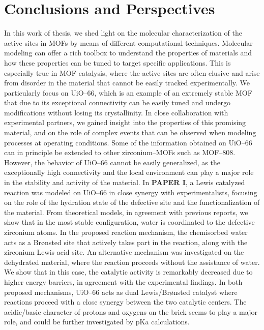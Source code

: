 \graphicspath{{figures/}}
\renewcommand\evenpagerightmark{{\scshape\small Conclusions and perspectives}} 
\renewcommand\oddpageleftmark{{\scshape\small Chapter 4}}


\hyphenation{}

\chapter[Conclusions and perspectives]%
{Conclusions and Perspectives}
\label{ch4}
In this work of thesis, we shed light on the molecular characterization of the active sites in MOFs by means of different computational techniques. Molecular modeling can offer a rich toolbox to understand the properties of materials and how these properties can be tuned to target specific applications. This is especially true in MOF catalysis, where the active sites are often elusive and arise from disorder in the material that cannot be easily tracked experimentally. We particularly focus on UiO--66, which is an example of an extremely stable MOF that due to its exceptional connectivity can be easily tuned and undergo modifications without losing its crystallinity. In close collaboration with experimental partners, we gained insight into the properties of this promising material, and on the role of complex events that can be observed when modeling processes at operating conditions. Some of the information obtained on UiO--66 can in principle be extended to other zirconium--MOFs such as MOF--808. However, the behavior of UiO--66 cannot be easily generalized, as the exceptionally high connectivity and the local environment can play a major role in the stability and activity of the material. 
\npar
In \textbf{PAPER I}, a Lewis catalyzed reaction was modeled on UiO--66 in close synergy with experimentalists, focusing on the role of the hydration state of the defective site and the functionalization of the material. From theoretical models, in agreement with previous reports, we show that in the most stable configuration, water is coordinated to the defective zirconium atoms. In the proposed reaction mechanism, the chemisorbed water acts as a Br\o{}nsted site that actively takes part in the reaction, along with the zirconium Lewis acid site. An alternative mechanism was investigated on the dehydrated material, where the reaction proceeds without the assistance of water. We show that in this case, the catalytic activity is remarkably decreased due to higher energy barriers, in agreement with the experimental findings. In both proposed mechanisms, UiO--66 acts as dual Lewis/Br\o{}nsted catalyst where reactions proceed with a close synergy between the two catalytic centers. The acidic/basic character of protons and oxygens on the brick seems to play a major role, and could be further investigated by pKa calculations.
